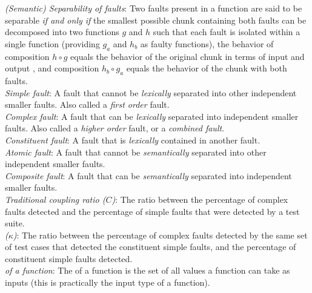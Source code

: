 \documentclass[preprint,nonatbib]{sigplanconf}\usepackage[]{graphicx}\usepackage[]{color}
\begin{document}
\begin{infobox}
\noindent\emph{(Semantic) Separability of faults}: Two faults present in a function are said to be separable \emph{if and only if} the smallest possible chunk containing both faults can be decomposed into two functions $g$ and $h$ such that each fault is isolated within a single function (providing $g_a$ and $h_b$ as faulty functions), the behavior of composition $h \circ g$ equals the behavior of the original chunk in terms of input and output , and composition $h_b \circ g_a$ equals the behavior of the chunk with both faults. \\
\noindent\emph{Simple fault}: A fault that cannot be \emph{lexically} separated into other independent smaller faults. Also called a \emph{first order} fault. \\
\noindent\emph{Complex fault}: A fault that can be \emph{lexically} separated into independent smaller faults. Also called a \emph{higher order} fault, or a \emph{combined fault}. \\
\noindent\emph{Constituent fault}: A fault that is \emph{lexically} contained in another fault.\\
\noindent\emph{Atomic fault}: A fault that cannot be \emph{semantically} separated into other independent smaller faults.\\
\noindent\emph{Composite fault}: A fault that can be \emph{semantically} separated into independent smaller faults. \\
\noindent\emph{Traditional coupling ratio ($C$)}: The ratio between the percentage of complex faults detected and the percentage of simple faults that were detected by a test suite.\\
\noindent\emph{\KappaT ($\kappa$)}: The ratio between the percentage of complex faults detected by the same set of test cases that detected the constituent simple faults, and the percentage of constituent simple faults detected.\\
\noindent\emph{\fInput of a function}: The \finput of a function is the set of all values a function can take as inputs (this is practically the input type of a function).\\

\end{infobox}
\end{document}
